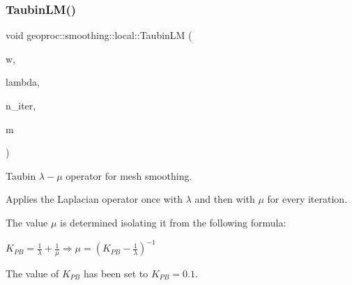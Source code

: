 \subsubsection{\texorpdfstring{Taubin\+L\+M()}{TaubinLM()}\hspace{0.1cm}{\footnotesize\ttfamily [1/2]}}
{\footnotesize\ttfamily void geoproc\+::smoothing\+::local\+::\+Taubin\+LM (\begin{DoxyParamCaption}\item[{const \hyperlink{namespacegeoproc_a12e5a10581b53b9dd9a509127527f843}{weight} \&}]{w,  }\item[{float}]{lambda,  }\item[{size\+\_\+t}]{n\+\_\+iter,  }\item[{\hyperlink{classgeoproc_1_1TriangleMesh}{Triangle\+Mesh} \&}]{m }\end{DoxyParamCaption})}



Taubin $\lambda-\mu$ operator for mesh smoothing. 

Applies the Laplacian operator once with $\lambda$ and then with $\mu$ for every iteration.

The value $\mu$ is determined isolating it from the following formula\+:

$K_{PB} = \frac{1}{\lambda} + \frac{1}{\mu} \Rightarrow \mu = \left( K_{PB} - \frac{1}{\lambda} \right)^{-1}$

The value of $K_{PB}$ has been set to $K_{PB}=0.1$.


